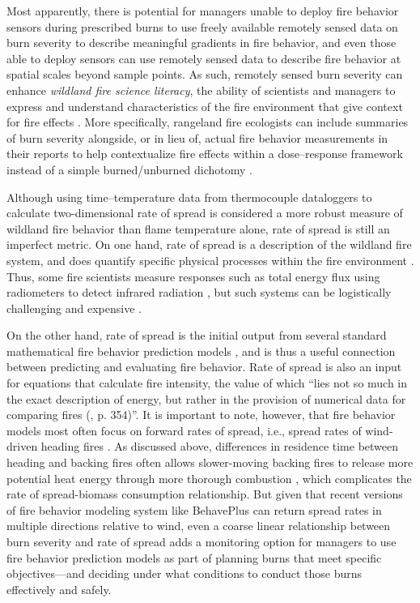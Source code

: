 \documentclass[fire,article,accept,oneauthor,pdftex]{Definitions/mdpi}
\begin{document}
Most apparently, there is potential for managers unable to deploy fire behavior sensors during prescribed burns to use freely available remotely sensed data on burn severity to describe meaningful gradients in fire behavior, and even those able to deploy sensors can use remotely sensed data to describe fire behavior at  spatial scales beyond sample points. 
As such, remotely sensed burn severity can enhance \emph{wildland fire science literacy}, the ability of scientists and managers to express and understand characteristics of the fire environment that give context for fire effects \cite{mcgranahan2018, mcgranahan2022a}. 
More specifically, rangeland fire ecologists can include summaries of burn severity alongside, or in lieu of, actual fire behavior measurements in their reports to help contextualize fire effects within a dose--response framework instead of a simple burned/unburned dichotomy \cite{smith2016a}. 

Although using time--temperature data from thermocouple dataloggers to calculate two-dimensional rate of spread is considered a more robust measure of wildland fire behavior than flame temperature alone, rate of spread is still an imperfect metric.
On one hand, rate of spread is a description of the wildland fire system, and does quantify specific physical processes within the fire environment \cite{finney2021}. 
Thus, some fire scientists measure responses such as total energy flux using radiometers to detect infrared radiation \cite{butler2004, kremens2012, obrien2018}, but such systems can be logistically challenging and expensive \cite{butler2010}. 

On the other hand, rate of spread is the initial output from several standard mathematical fire behavior prediction models \cite{rothermel1972,noble1980}, and is thus a useful connection between predicting and evaluating fire behavior. 
Rate of spread is also an input for equations that calculate fire intensity, the value of which ``lies not so much in the exact description of energy, but rather in the provision of numerical data for comparing fires (\cite{alexander1982}, p. 354)''. 
It is important to note, however, that fire behavior models most often focus on forward rates of spread, {i.e.}, spread rates of wind-driven heading fires \cite{rothermel1983}. 
As discussed above, differences in residence time between heading and backing fires often allows slower-moving backing fires to release more potential heat energy through more thorough combustion \cite{trollope1984}, which complicates the rate of spread-biomass consumption relationship.
But given that recent versions of fire behavior modeling system like BehavePlus \cite{heinsch2010} can return spread rates in multiple directions relative to wind, even a coarse linear relationship between burn severity and rate of spread adds a monitoring option for managers to use fire behavior prediction models as part of planning burns that meet specific objectives---and deciding under what conditions to conduct those burns effectively and safely. 
\end{document}
